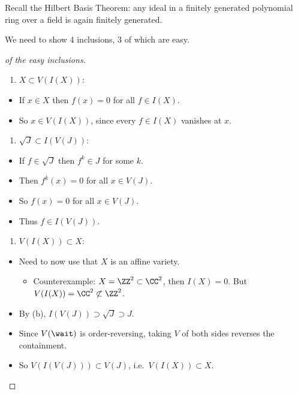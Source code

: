 \begin{fact}

Recall the Hilbert Basis Theorem: any ideal in a finitely generated
polynomial ring over a field is again finitely generated.

\end{fact}

We need to show 4 inclusions, 3 of which are easy.

\begin{proof}[of the easy inclusions]

\envlist

\begin{enumerate}
\def\labelenumi{\alph{enumi}.}
\tightlist
\item
  \(X \subset V(I(X))\):
\end{enumerate}

\begin{itemize}
\tightlist
\item
  If \(x\in X\) then \(f(x) = 0\) for all \(f\in I(X)\).
\item
  So \(x\in V(I(X))\), since every \(f\in I(X)\) vanishes at \(x\).
\end{itemize}

\begin{enumerate}
\def\labelenumi{\alph{enumi}.}
\setcounter{enumi}{1}
\tightlist
\item
  \(\sqrt{J} \subset I(V(J))\):
\end{enumerate}

\begin{itemize}
\tightlist
\item
  If \(f\in \sqrt{J}\) then \(f^k \in J\) for some \(k\).
\item
  Then \(f^k(x) = 0\) for all \(x\in V(J)\).
\item
  So \(f(x) = 0\) for all \(x\in V(J)\).
\item
  Thus \(f\in I(V(J))\).
\end{itemize}

\begin{enumerate}
\def\labelenumi{\alph{enumi}.}
\setcounter{enumi}{2}
\tightlist
\item
  \(V(I(X)) \subset X\):
\end{enumerate}

\begin{itemize}
\tightlist
\item
  Need to now use that \(X\) is an affine variety.

  \begin{itemize}
  \tightlist
  \item
    Counterexample: \(X = \ZZ^2 \subset \CC^2\), then \(I(X) = 0\). But
    \(V(I(X)) = \CC^2 \not\subset \ZZ^2\).
  \end{itemize}
\item
  By (b), \(I(V(J)) \supset \sqrt{J} \supset J\).
\item
  Since \(V(\wait)\) is order-reversing, taking \(V\) of both sides
  reverses the containment.
\item
  So \(V(I(V(J))) \subset V(J)\), i.e.~\(V(I(X)) \subset X\).
\end{itemize}

\end{proof}

